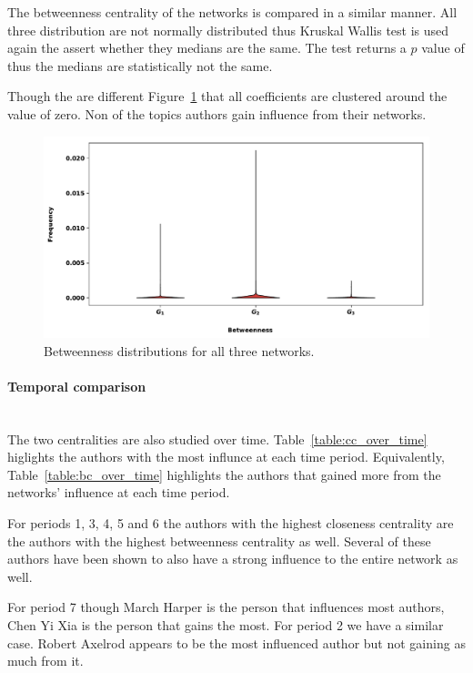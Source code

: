 \documentclass{article}
\theoremstyle{definition}
\begin{document}
The betweenness centrality of the networks is compared in a similar manner.
All three distribution are not normally distributed thus Kruskal Wallis test
is used again the assert whether they medians are the same. The test returns
a \(p\) value of  thus the medians are statistically not the same.

Though the are different Figure~\ref{fig:closeness_dist} that all coefficients
are clustered around the value of zero. Non of the topics authors gain influence
from their networks.

\begin{center}
\begin{figure}[!hbtp]
    \centering
    \includegraphics[width=.8\textwidth]{./assets/images/Betweenness_histrograms.pdf}
    \caption{Betweenness distributions for all three networks.}\label{fig:closeness_dist}
\end{figure}
\end{center}

\paragraph{Temporal comparison}
\mbox{ }\\

The two centralities are also studied over time. Table~\ref{table:cc_over_time} higlights
the authors with the most influnce at each time period. Equivalently, Table~\ref{table:bc_over_time}
highlights the authors that gained more from the networks' influence at each
time period.

For periods 1, 3, 4, 5 and 6 the authors with the highest closeness centrality
are the authors with the highest betweenness centrality as well. Several of these
authors have been shown to also have a strong influence to the entire network
as well.

For period 7 though March Harper is the person that influences most authors,
Chen Yi Xia is the person that gains the most. For period 2 we have a similar
case. Robert Axelrod appears to be the most influenced author but not gaining 
as much from it.
\end{document}
